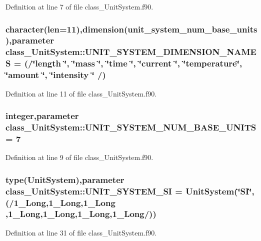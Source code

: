 Definition at line 7 of file class\_\-UnitSystem.f90.

\hypertarget{namespaceclass__UnitSystem_a858e9cba24dcf0fd6b7858ee3acfaed0}{
\subsubsection[{UNIT\_\-SYSTEM\_\-DIMENSION\_\-NAMES}]{\setlength{\rightskip}{0pt plus 5cm}character(len=11),dimension(unit\_\-system\_\-num\_\-base\_\-units),parameter {\bf class\_\-UnitSystem::UNIT\_\-SYSTEM\_\-DIMENSION\_\-NAMES} = (/\char`\"{}length \char`\"{}, \char`\"{}mass \char`\"{}, \char`\"{}time \char`\"{}, \char`\"{}current \char`\"{}, \char`\"{}temperature\char`\"{}, \char`\"{}amount \char`\"{}, \char`\"{}intensity \char`\"{} /)}}
\label{namespaceclass__UnitSystem_a858e9cba24dcf0fd6b7858ee3acfaed0}


Definition at line 11 of file class\_\-UnitSystem.f90.

\hypertarget{namespaceclass__UnitSystem_a246bc92fbae303b4776c58fbf2dde427}{
\subsubsection[{UNIT\_\-SYSTEM\_\-NUM\_\-BASE\_\-UNITS}]{\setlength{\rightskip}{0pt plus 5cm}integer,parameter {\bf class\_\-UnitSystem::UNIT\_\-SYSTEM\_\-NUM\_\-BASE\_\-UNITS} = 7}}
\label{namespaceclass__UnitSystem_a246bc92fbae303b4776c58fbf2dde427}


Definition at line 9 of file class\_\-UnitSystem.f90.

\hypertarget{namespaceclass__UnitSystem_a45c989c4dd3741245372a6685f244345}{
\subsubsection[{UNIT\_\-SYSTEM\_\-SI}]{\setlength{\rightskip}{0pt plus 5cm}type({\bf UnitSystem}),parameter {\bf class\_\-UnitSystem::UNIT\_\-SYSTEM\_\-SI} = {\bf UnitSystem}(\char`\"{}SI\char`\"{}, (/1\_\-Long,1\_\-Long,1\_\-Long ,1\_\-Long,1\_\-Long,1\_\-Long,1\_\-Long/))}}
\label{namespaceclass__UnitSystem_a45c989c4dd3741245372a6685f244345}


Definition at line 31 of file class\_\-UnitSystem.f90.

